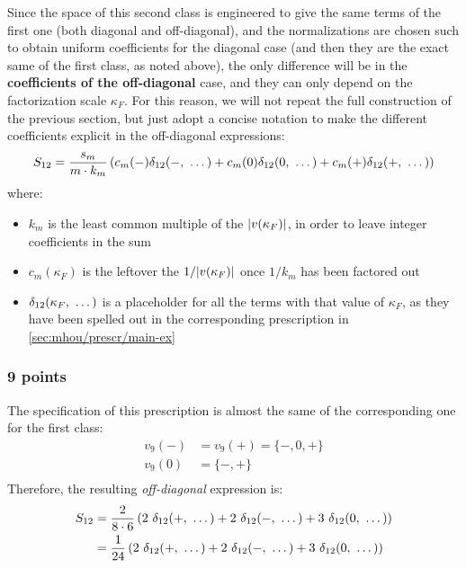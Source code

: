 Since the space of this second class is engineered to give the same terms of
the first one (both diagonal and off-diagonal), and the normalizations are
chosen such to obtain uniform coefficients for the diagonal case (and then they
are the exact same of the first class, as noted above), the only difference
will be in the \textbf{coefficients of the off-diagonal} case, and they can
only depend on the factorization scale $\kappa_F$.
For this reason, we will not repeat the full construction of the previous
section, but just adopt a concise notation to make the different coefficients
explicit in the off-diagonal expressions:
\begin{equation}
    S_{12} = \frac{s_m}{m \cdot k_m} \left(c_m(-) \delta_{12}(-,\ \dots) +
        c_m(0) \delta_{12}(0,\ \dots) + c_m(+) \delta_{12}(+,\ \dots)\right)
\end{equation}
where:
\begin{itemize}
    \item $k_m$ is the least common multiple of the $\abs{v(\kappa_F)}$, in
        order to leave integer coefficients in the sum
    \item $c_m(\kappa_F)$ is the leftover the $1/\abs{v(\kappa_F)}$ once
        $1/k_m$ has been factored out
    \item $\delta_{12}(\kappa_F,\ \dots)$ is a placeholder for all the terms with that
        value of $\kappa_F$, as they have been spelled out in the corresponding
        prescription in \cref{sec:mhou/prescr/main-ex}
\end{itemize}

\subsubsection{9 points}

The specification of this prescription is almost the same of the corresponding
one for the first class:
\begin{align}
    \label{eq:mhou/prescr/5specs-slices}
    v_9(-) &= v_9(+) = \{-, 0, +\}\\
    v_9(0) &= \{-, +\}\\
\end{align}
Therefore, the resulting \textit{off-diagonal} expression is:
\begin{align}
    S_{12} &= \frac{2}{8 \cdot 6} \left(2\ \deltagroup{+} + 2\ \deltagroup{-} + 3\ \deltagroup{0}\right)\\
        &= \frac{1}{24} \left(2\ \deltagroup{+} + 2\ \deltagroup{-} + 3\ \deltagroup{0}\right)
\end{align}

